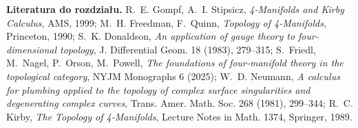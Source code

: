 \medskip
\noindent\textbf{Literatura do rozdziału.}
R.~E. Gompf, A.~I. Stipsicz,
\emph{4-Manifolds and Kirby Calculus}, AMS, 1999;
M.~H. Freedman, F.~Quinn,
\emph{Topology of 4-Manifolds}, Princeton, 1990;
S.~K. Donaldson, \emph{An application of gauge theory
to four-dimensional topology},
J. Differential Geom. 18 (1983), 279--315;
S.~Friedl, M.~Nagel, P.~Orson, M.~Powell,
\emph{The foundations of four-manifold theory
in the topological category}, NYJM Monographs 6 (2025);
W.~D. Neumann, \emph{A calculus for plumbing applied to the
topology of complex surface singularities and degenerating complex
curves}, Trans. Amer. Math. Soc. 268 (1981), 299--344;
R.~C. Kirby, \emph{The Topology of 4-Manifolds},
Lecture Notes in Math. 1374, Springer, 1989.


